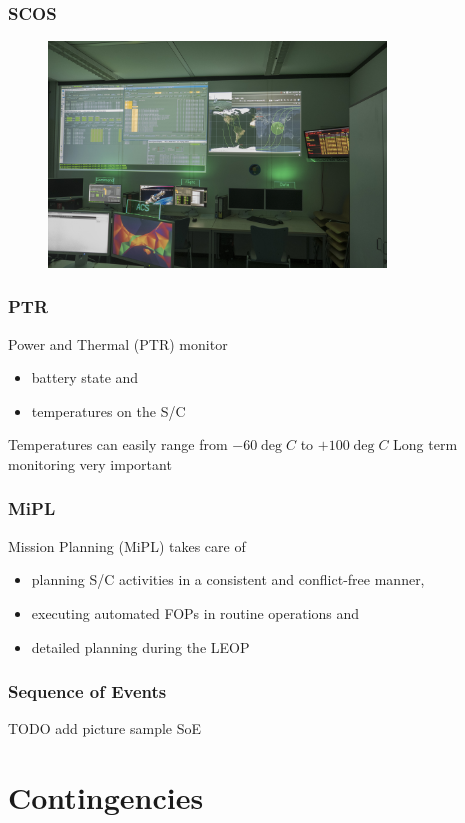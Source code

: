 \documentclass[12pt,utf8,notheorems,compress]{beamer}
\begin{document}
\begin{frame}
  \frametitle{SCOS}
  \begin{figure}[!ht]
    \centering
    \includegraphics[width=0.8\textwidth]{scos.jpg}
  \end{figure}
\end{frame}

\begin{frame}
  \frametitle{PTR}
  \pause
  Power and Thermal (PTR) monitor
  \begin{itemize}
  \item battery state and \pause
  \item temperatures on the S/C
  \end{itemize}
  \vfill
  Temperatures can easily range from $-60\deg C$ to $+100\deg C$
  \vfill
  Long term monitoring very important
\end{frame}

\begin{frame}
  \frametitle{MiPL}
  \pause
  Mission Planning (MiPL) takes care of
  \begin{itemize}
  \item planning S/C activities in a consistent and conflict-free manner, \pause
  \item executing automated FOPs in routine operations and \pause
  \item detailed planning during the LEOP
  \end{itemize}
\end{frame}

\begin{frame}
  \frametitle{Sequence of Events}
  \pause
  TODO add picture sample SoE
\end{frame}

\section{Contingencies}
\end{document}
